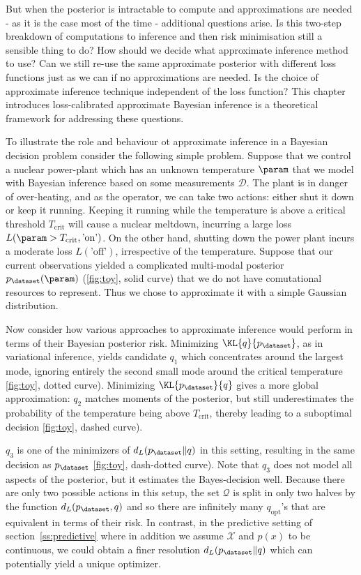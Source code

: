 But when the posterior is intractable to compute and approximations are needed - as it is the case most of the time - additional questions arise. Is this two-step breakdown of computations to inference and then risk minimisation still a sensible thing to do? How should we decide what approximate inference method to use? Can we still re-use the same approximate posterior with different loss functions just as we can if no approximations are needed. Is the choice of approximate inference technique independent of the loss function? This chapter introduces loss-calibrated approximate Bayesian inference is a theoretical framework for addressing these questions.

To illustrate the role and behaviour ot approximate inference in a Bayesian decision problem consider the following simple problem. Suppose that we control a nuclear power-plant which has an unknown temperature $\param$ that we model with Bayesian inference based on some measurements $\mathcal{D}$.
The plant is in danger of over-heating, and as the operator, we can take two actions: either shut it down or keep it running. Keeping it running while the temperature is above a critical threshold $T_\mathrm{crit}$ will cause a nuclear meltdown, incurring a large loss $L(\param>T_\mathrm{crit},\mbox{'on'})$. On the other hand, shutting down the power plant incurs a moderate loss $L(\mbox{'off'})$, irrespective of the temperature. 
Suppose that our current observations yielded a complicated multi-modal posterior $p_\dataset(\param)$ (\ref{fig:toy}, solid curve) that we do not have comutational resources to represent. Thus we chose to approximate it with a simple Gaussian distribution.

Now consider how various approaches to approximate inference would perform in terms of their Bayesian posterior risk. Minimizing $\KL{q}{p_\dataset}$, as in variational inference, yields candidate $q_1$ which concentrates around the largest mode, ignoring entirely the second small mode around the critical temperature \ref{fig:toy}, dotted curve). Minimizing $\KL{p_\dataset}{q}$ gives a more global approximation: $q_2$ matches moments of the posterior, but still underestimates the probability of the temperature being above $T_\mathrm{crit}$, thereby leading to a suboptimal decision \ref{fig:toy}, dashed curve).

 $q_3$ is one of the minimizers of $d_L(p_\dataset \| q)$ in this setting, resulting in the same decision as $p_\dataset$ \ref{fig:toy}, dash-dotted curve). Note that $q_3$ does not model all aspects of the posterior, but it estimates the Bayes-decision well. Because there are only two possible actions in this setup, the set $\mathcal{Q}$ is split in only two halves by the function $d_L(p_\dataset,q)$ and so there are infinitely many $q_\mathrm{opt}$'s that are equivalent in terms of their risk. In contrast, in the predictive setting of section~\ref{ss:predictive} where in addition we assume $\mathcal{X}$ and $p(x)$ to be continuous, we could obtain a finer resolution $d_L(p_\dataset \| q)$ which can potentially yield a unique optimizer.

